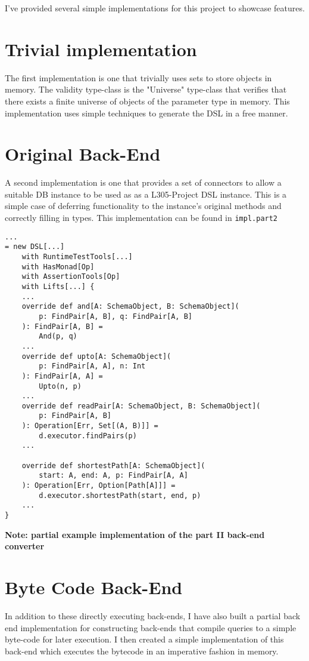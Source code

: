 \documentclass{report}
\newcommand \2[0]{\textbf{2}}
\newcommand \3[0]{\textbf{3}}
\newcommand{\todo}[1]{\textbf{#1}}
\begin{document}
I've provided several simple implementations for this project to showcase features.
\section{Trivial implementation}
The first implementation is one that trivially uses sets  to store objects in memory. The validity type-class is the "Universe" type-class that verifies that there exists a finite universe of objects of the parameter type in memory. This implementation uses simple techniques to generate the DSL in a free manner.

\section{Original Back-End}
A second implementation is one that provides a set of connectors to allow a suitable DB instance to be used as as a L305-Project DSL instance. This is a simple case of deferring functionality to the instance's original methods and correctly filling in types.
This implementation can be found in \texttt{impl.part2} 

\begin{verbatim}
...
= new DSL[...]
    with RuntimeTestTools[...]
    with HasMonad[Op]
    with AssertionTools[Op]
    with Lifts[...] {
    ...
    override def and[A: SchemaObject, B: SchemaObject](
        p: FindPair[A, B], q: FindPair[A, B]
    ): FindPair[A, B] =
        And(p, q)
    ...
    override def upto[A: SchemaObject](
        p: FindPair[A, A], n: Int
    ): FindPair[A, A] =
        Upto(n, p)
    ...
    override def readPair[A: SchemaObject, B: SchemaObject](
        p: FindPair[A, B]
    ): Operation[Err, Set[(A, B)]] =
        d.executor.findPairs(p)
    ...
        
    override def shortestPath[A: SchemaObject](
        start: A, end: A, p: FindPair[A, A]
    ): Operation[Err, Option[Path[A]]] =
        d.executor.shortestPath(start, end, p)
    ...
}
\end{verbatim}
\todo{Note: partial example implementation of the part II back-end converter}

\section{Byte Code Back-End}

In addition to these directly executing back-ends, I have also built a partial back end implementation for constructing back-ends that compile queries to a simple byte-code for later execution. I then created a simple implementation of this back-end which executes the bytecode in an imperative fashion in memory.
\end{document}
